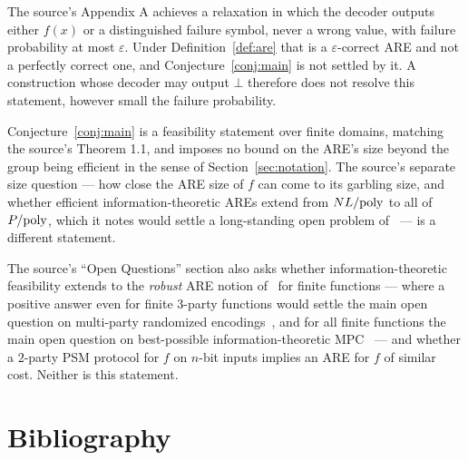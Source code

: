 \documentclass{aicr-conjecture}
\newcommand{\eps}{\varepsilon}
\begin{document}
\begin{remark}\label{rem:lasvegas}
The source's Appendix A achieves a relaxation in which the decoder
outputs either $f(x)$ or a distinguished failure symbol, never a wrong
value, with failure probability at most $\eps$. Under
Definition~\ref{def:are} that is a $\eps$-correct ARE and not a perfectly
correct one, and Conjecture~\ref{conj:main} is not settled by it. A
construction whose decoder may output $\bot$ therefore does not resolve
this statement, however small the failure probability.
\end{remark}

\begin{remark}
Conjecture~\ref{conj:main} is a feasibility statement over finite
domains, matching the source's Theorem 1.1, and imposes no bound on the
ARE's size beyond the group being efficient in the sense of
Section~\ref{sec:notation}. The source's separate size question --- how
close the ARE size of $f$ can come to its garbling size, and whether
efficient information-theoretic AREs extend from $NL/\mathrm{poly}$ to all of
$P/\mathrm{poly}$, which it notes would settle a long-standing open problem
of~\cite{FKN94} --- is a different statement.
\end{remark}

\begin{remark}
The source's ``Open Questions'' section also asks whether
information-theoretic feasibility extends to the \emph{robust} ARE
notion of~\cite{HIKR23} for finite functions --- where a positive answer
even for finite $3$-party functions would settle the main open question
on multi-party randomized encodings~\cite{ABT21}, and for all finite
functions the main open question on best-possible information-theoretic
MPC~\cite{HIKR18} --- and whether a $2$-party PSM protocol for $f$ on
$n$-bit inputs implies an ARE for $f$ of similar cost. Neither is this
statement.
\end{remark}

\section{Bibliography}
\end{document}

